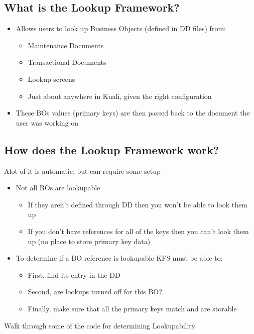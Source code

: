 \begin{ifhtml}
    \begin{s5slide}
        \section{What is the Lookup Framework?}
            \begin{itemize}
                \item Allows users to look up Business Objects (defined in DD files) from:
                \begin{itemize}
                    \item Maintenance Documents
                    \item Transactional Documents
                    \item Lookup screens
                    \item Just about anywhere in Kuali, given the right configuration
                \end{itemize}
                \item These BOs values (primary keys) are then passed back to the document the user was working on
            \end{itemize}
    \end{s5slide}
    \begin{s5slide}
        \section{How does the Lookup Framework work?}
        Alot of it is automatic, but can require some setup
            \begin{itemize}
                \item Not all BOs are lookupable
                \begin{itemize}
                    \item If they aren't defined through DD then you won't be able to look them up
                    \item If you don't have references for all of the keys then you can't look them up (no place to store primary key data)
                \end{itemize}
                \item To determine if a BO reference is lookupable KFS must be able to:
                \begin{itemize}
                    \item First, find its entry in the DD
                    \item Second, are lookups turned off for this BO?
                    \item Finally, make sure that all the primary keys match and are storable
                \end{itemize}
            \end{itemize}
            \begin{s5notes}
                Walk through some of the code for determining Lookupability
            \end{s5notes}
    \end{s5slide}
    \begin{s5slide}

\end{s5slide}
\end{ifhtml}
